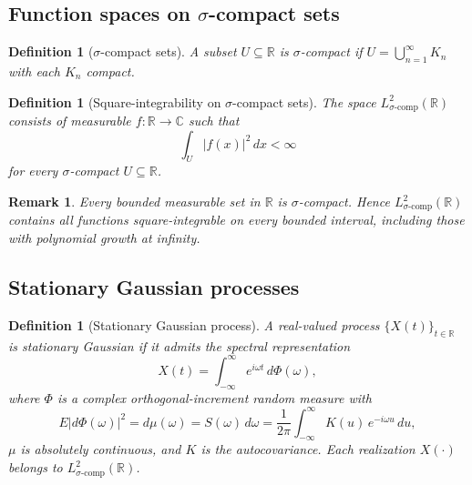 \documentclass{article}
\newtheorem{definition}[theorem]{Definition}
\newtheorem{remark}[theorem]{Remark}
\begin{document}
\subsection{Function spaces on $\sigma$-compact sets}

\begin{definition}[$\sigma$-compact sets]\label{def:sigma_compact}
A subset $U \subseteq \mathbb{R}$ is $\sigma$-compact if $U = \bigcup_{n=1}^{\infty} K_n$ with each $K_n$ compact.
\end{definition}

\begin{definition}[Square-integrability on $\sigma$-compact sets]\label{def:L2_sigma_compact}
The space $L^2_{\sigma\text{-comp}}(\mathbb{R})$ consists of measurable $f:\mathbb{R}\to\mathbb{C}$ such that
\[
\int_U |f(x)|^2\,dx < \infty
\]
for every $\sigma$-compact $U \subseteq \mathbb{R}$.
\end{definition}

\begin{remark}\label{rem:sigma_compact_properties}
Every bounded measurable set in $\mathbb{R}$ is $\sigma$-compact. Hence $L^2_{\sigma\text{-comp}}(\mathbb{R})$ contains all functions square-integrable on every bounded interval, including those with polynomial growth at infinity.
\end{remark}

\subsection{Stationary Gaussian processes}

\begin{definition}[Stationary Gaussian process]\label{def:stationary}
A real-valued process $\{X(t)\}_{t\in\mathbb{R}}$ is stationary Gaussian if it admits the spectral representation
\begin{equation}\label{eq:stationary_rep}
X(t) = \int_{-\infty}^{\infty} e^{i\omega t}\, d\Phi(\omega),
\end{equation}
where $\Phi$ is a complex orthogonal-increment random measure with
\begin{equation}
E|d\Phi(\omega)|^2 = d\mu(\omega) = S(\omega)\, d\omega = \frac{1}{2\pi}\int_{-\infty}^{\infty} K(u)\, e^{-i\omega u}\, du,
\end{equation}
$\mu$ is absolutely continuous, and $K$ is the autocovariance. Each realization $X(\cdot)$ belongs to $L^2_{\sigma\text{-comp}}(\mathbb{R})$.
\end{definition}
\end{document}
